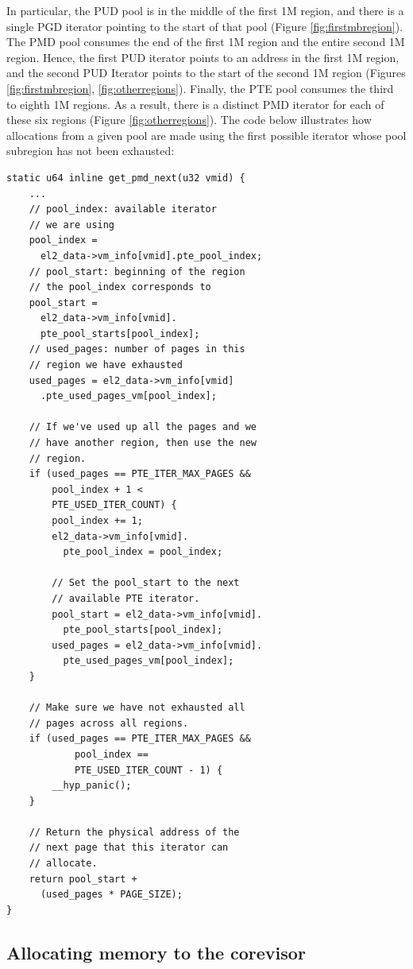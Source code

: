 In particular, the PUD pool is in the middle of the first 1M region, and there is a single PGD iterator
pointing to the start of that pool (Figure \ref{fig:firstmbregion}). The PMD pool consumes the end of the first 1M region
and the entire second 1M region. Hence, the first PUD iterator points to an address in
the first 1M region, and the second PUD Iterator points to the start of the
second 1M region (Figures \ref{fig:firstmbregion}, \ref{fig:otherregions}). Finally, the PTE pool consumes the third to eighth 1M regions.
As a result, there is a distinct PMD iterator for each of these six regions
(Figure \ref{fig:otherregions}). The code below illustrates how allocations from a given pool are made using
the first possible iterator whose pool subregion has not
been exhausted:

\begin{verbatim}
static u64 inline get_pmd_next(u32 vmid) {
    ...
    // pool_index: available iterator
    // we are using
    pool_index =
      el2_data->vm_info[vmid].pte_pool_index;
    // pool_start: beginning of the region
    // the pool_index corresponds to
    pool_start =
      el2_data->vm_info[vmid].
      pte_pool_starts[pool_index];
    // used_pages: number of pages in this
    // region we have exhausted
    used_pages = el2_data->vm_info[vmid]
      .pte_used_pages_vm[pool_index];

    // If we've used up all the pages and we
    // have another region, then use the new
    // region.
    if (used_pages == PTE_ITER_MAX_PAGES &&
        pool_index + 1 <
        PTE_USED_ITER_COUNT) {
        pool_index += 1;
        el2_data->vm_info[vmid].
          pte_pool_index = pool_index;

        // Set the pool_start to the next
        // available PTE iterator.
        pool_start = el2_data->vm_info[vmid].
          pte_pool_starts[pool_index];
        used_pages = el2_data->vm_info[vmid].
          pte_used_pages_vm[pool_index];
    }

    // Make sure we have not exhausted all
    // pages across all regions.
    if (used_pages == PTE_ITER_MAX_PAGES &&
            pool_index ==
            PTE_USED_ITER_COUNT - 1) {
        __hyp_panic();
    }

    // Return the physical address of the
    // next page that this iterator can
    // allocate.
    return pool_start +
      (used_pages * PAGE_SIZE);
}
\end{verbatim}


\subsection{Allocating memory to the corevisor}

